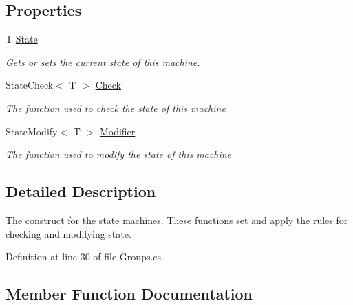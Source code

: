\subsection*{Properties}
\begin{DoxyCompactItemize}
\item 
T \hyperlink{classHumDrum_1_1Collections_1_1Groups_1_1StateObject_a192fdeea48e27612063d5099456ec217}{State}
\begin{DoxyCompactList}\small\item\em Gets or sets the current state of this machine. \end{DoxyCompactList}\item 
State\+Check$<$ T $>$ \hyperlink{classHumDrum_1_1Collections_1_1Groups_1_1StateObject_aca3a9433c50c52f7364d5239d3847749}{Check}
\begin{DoxyCompactList}\small\item\em The function used to check the state of this machine \end{DoxyCompactList}\item 
State\+Modify$<$ T $>$ \hyperlink{classHumDrum_1_1Collections_1_1Groups_1_1StateObject_a0d961b56d3c86f24a5185cb1812285ac}{Modifier}
\begin{DoxyCompactList}\small\item\em The function used to modify the state of this machine \end{DoxyCompactList}\end{DoxyCompactItemize}


\subsection{Detailed Description}
The construct for the state machines. These functions set and apply the rules for checking and modifying state. 



Definition at line 30 of file Groups.\+cs.



\subsection{Member Function Documentation}
